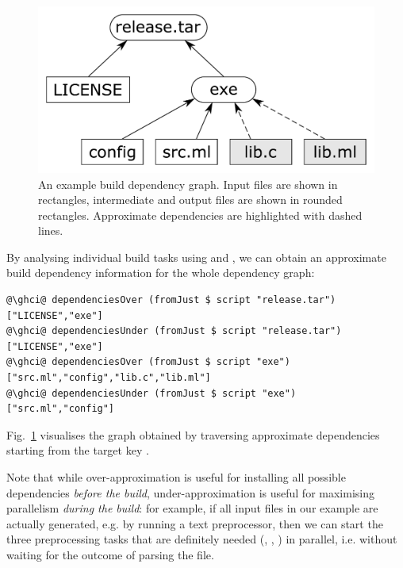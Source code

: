 {\begin{figure}
\centerline{\includegraphics[scale=0.3]{fig/build-dependencies.pdf}}
\caption{An example build dependency graph. Input files are shown in rectangles,
intermediate and output files are shown in rounded rectangles. Approximate
dependencies are highlighted with dashed lines.}
\label{fig-build}
\end{figure}

By analysing individual build tasks using  and
, we can obtain an approximate build dependency
information for the whole dependency graph:

\vspace{1mm}
\begin{verbatim}
@\ghci@ dependenciesOver (fromJust $ script "release.tar")
["LICENSE","exe"]
@\ghci@ dependenciesUnder (fromJust $ script "release.tar")
["LICENSE","exe"]
@\ghci@ dependenciesOver (fromJust $ script "exe")
["src.ml","config","lib.c","lib.ml"]
@\ghci@ dependenciesUnder (fromJust $ script "exe")
["src.ml","config"]
\end{verbatim}
\vspace{1mm}

\noindent
Fig.~\ref{fig-build} visualises the graph obtained by traversing approximate
dependencies starting from the target key .

Note that while over-approximation is useful for installing all possible
dependencies \emph{before the build}, under-approximation is useful for
maximising parallelism \emph{during the build}: for example, if all input files
in our example are actually generated, e.g. by running a text preprocessor, then
we can start the three preprocessing tasks that are definitely needed
(, , ) in parallel, i.e. without waiting
for the outcome of parsing the  file.

}
